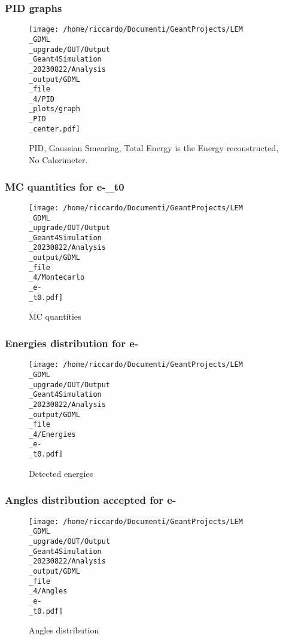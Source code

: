 \documentclass[8pt]{beamer}
\begin{document}
            \begin{frame}
                \frametitle{PID graphs}
            
        \begin{figure}[h]
            \centering
            \texttt{[image: /home/riccardo/Documenti/GeantProjects/LEM\\\_GDML\\\_upgrade/OUT/Output\\\_Geant4Simulation\\\_20230822/Analysis\\\_output/GDML\\\_file\\\_4/PID\\\_plots/graph\\\_PID\\\_center.pdf]}
            \caption{PID, Gaussian Smearing, Total Energy is the Energy reconstructed, No Calorimeter.}
        \end{figure}
        
            \end{frame}
            
            \begin{frame}
                \frametitle{MC quantities for e-\_t0}
            
        \begin{figure}[h]
            \centering
            \texttt{[image: /home/riccardo/Documenti/GeantProjects/LEM\\\_GDML\\\_upgrade/OUT/Output\\\_Geant4Simulation\\\_20230822/Analysis\\\_output/GDML\\\_file\\\_4/Montecarlo\\\_e-\\\_t0.pdf]}
            \caption{MC quantities}
        \end{figure}
        
            \end{frame}
            
            \begin{frame}
                \frametitle{Energies distribution for e-}
            
        \begin{figure}[h]
            \centering
            \texttt{[image: /home/riccardo/Documenti/GeantProjects/LEM\\\_GDML\\\_upgrade/OUT/Output\\\_Geant4Simulation\\\_20230822/Analysis\\\_output/GDML\\\_file\\\_4/Energies\\\_e-\\\_t0.pdf]}
            \caption{Detected energies}
        \end{figure}
        
            \end{frame}
            
            \begin{frame}
                \frametitle{Angles distribution accepted for e-}
            
        \begin{figure}[h]
            \centering
            \texttt{[image: /home/riccardo/Documenti/GeantProjects/LEM\\\_GDML\\\_upgrade/OUT/Output\\\_Geant4Simulation\\\_20230822/Analysis\\\_output/GDML\\\_file\\\_4/Angles\\\_e-\\\_t0.pdf]}
            \caption{Angles distribution}
        \end{figure}
        
            \end{frame}
            
\end{document}
